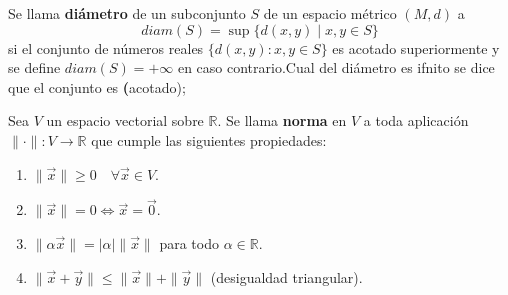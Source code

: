 \begin{definición}[Diámetro]
    Se llama \textbf{diámetro} de un subconjunto $S$ de un espacio métrico $(M, d)$ a
    $$diam(S) = \sup\{d(x, y) \mid x, y \in S\}$$
    si el conjunto de números reales $\{d(x,y) : x,y \in S\}$ es acotado superiormente y se define $diam(S) = +\infty$ en caso contrario.Cual del diámetro es ifnito se dice que el conjunto es \textbf(acotado);
\end{definición}

\begin{definición}[Norma]
    Sea $V$ un espacio vectorial sobre $\mathbb{R}$. Se llama \textbf{norma} en $V$ a toda aplicación $\|\cdot\|: V \to \mathbb{R}$ que cumple las siguientes propiedades:
    \begin{enumerate}
        \item $\|\vec{x}\| \geq 0 \quad \forall \vec{x} \in V$.
        \item $\|\vec{x}\| = 0 \Leftrightarrow \vec{x} = \vec{0}$.
        \item $\|\alpha \vec{x}\| = |\alpha| \|\vec{x}\|$ para todo $\alpha \in \mathbb{R}$.
        \item $\|\vec{x} + \vec{y}\| \leq \|\vec{x}\| + \|\vec{y}\|$ (desigualdad triangular).
    \end{enumerate}
\end{definición}


